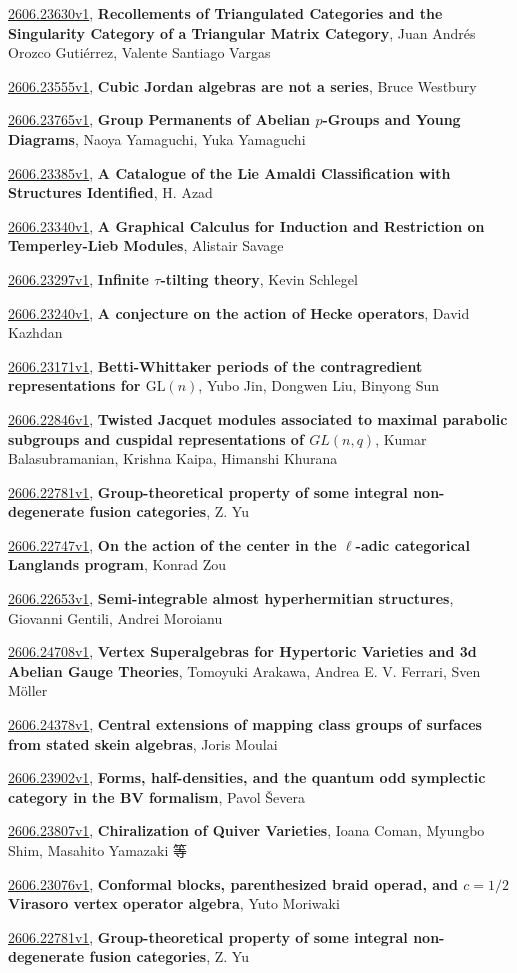 \documentclass[9pt, a4paper]{article}
\theoremstyle{plain}
\theoremstyle{definition}
\theoremstyle{remark}
\newcommand{\arxiv}[3]{\href{https://arxiv.org/abs/#1}{#1}, \textbf{\textcolor{arxivblue}{#2}}, #3}
\begin{document}
\arxiv{2606.23630v1}{Recollements of Triangulated Categories and the Singularity Category of a Triangular Matrix Category}{Juan Andrés Orozco Gutiérrez, Valente Santiago Vargas}

\arxiv{2606.23555v1}{Cubic Jordan algebras are not a series}{Bruce Westbury}

\arxiv{2606.23765v1}{Group Permanents of Abelian $p$-Groups and Young Diagrams}{Naoya Yamaguchi, Yuka Yamaguchi}

\arxiv{2606.23385v1}{A Catalogue of the Lie Amaldi Classification with Structures Identified}{H. Azad}

\arxiv{2606.23340v1}{A Graphical Calculus for Induction and Restriction on Temperley-Lieb Modules}{Alistair Savage}

\arxiv{2606.23297v1}{Infinite $τ$-tilting theory}{Kevin Schlegel}

\arxiv{2606.23240v1}{A conjecture on the action of Hecke operators}{David Kazhdan}

\arxiv{2606.23171v1}{Betti-Whittaker periods of the contragredient representations for $\textrm{GL}(n)$}{Yubo Jin, Dongwen Liu, Binyong Sun}

\arxiv{2606.22846v1}{Twisted Jacquet modules associated to maximal parabolic subgroups and cuspidal representations of $GL(n, q)$}{Kumar Balasubramanian, Krishna Kaipa, Himanshi Khurana}

\arxiv{2606.22781v1}{Group-theoretical property of some integral non-degenerate fusion categories}{Z. Yu}

\arxiv{2606.22747v1}{On the action of the center in the $\ell$-adic categorical Langlands program}{Konrad Zou}

\arxiv{2606.22653v1}{Semi-integrable almost hyperhermitian structures}{Giovanni Gentili, Andrei Moroianu}

\arxiv{2606.24708v1}{Vertex Superalgebras for Hypertoric Varieties and 3d Abelian Gauge Theories}{Tomoyuki Arakawa, Andrea E. V. Ferrari, Sven Möller}

\arxiv{2606.24378v1}{Central extensions of mapping class groups of surfaces from stated skein algebras}{Joris Moulai}

\arxiv{2606.23902v1}{Forms, half-densities, and the quantum odd symplectic category in the BV formalism}{Pavol Ševera}

\arxiv{2606.23807v1}{Chiralization of Quiver Varieties}{Ioana Coman, Myungbo Shim, Masahito Yamazaki 等}

\arxiv{2606.23076v1}{Conformal blocks, parenthesized braid operad, and $c=1/2$ Virasoro vertex operator algebra}{Yuto Moriwaki}

\arxiv{2606.22781v1}{Group-theoretical property of some integral non-degenerate fusion categories}{Z. Yu}

\end{document}
